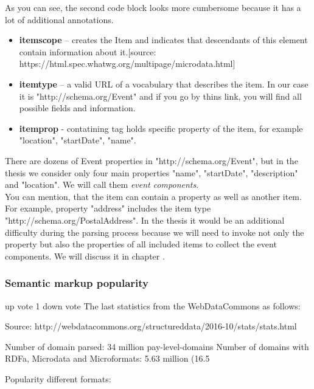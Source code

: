 As you can see, the second code block looks more cumbersome because it has a lot of additional annotations. 

\begin{itemize}
    \item \textbf{itemscope} – creates the Item and indicates that descendants of this element contain information about it.[source: https://html.spec.whatwg.org/multipage/microdata.html]
    \item \textbf{itemtype} – a valid URL of a vocabulary that describes the item. In our case it is "http://schema.org/Event" and if you go by thins link, you will find all possible fields and information. 
    \item \textbf{itemprop} - contatining tag holds specific property of the item, for example "location", "startDate", "name".
\end{itemize}

There are dozens of Event properties in "http://schema.org/Event", but in the thesis we consider only four main properties "name", "startDate", "description" and "location". We will call them \textit{event components}.\\

You can mention, that the item can contain a property as well as another item. For example, property "address" includes the item type "http://schema.org/PostalAddress". In the thesis it would be an additional difficulty during the parsing process because we will need to invoke not only the property but also the properties of all included items to collect the event components. We will discuss it in chapter . 

\subsubsection*{Semantic markup popularity}

up vote
1
down vote
The last statistics from the WebDataCommons as follows:

Source: http://webdatacommons.org/structureddata/2016-10/stats/stats.html

Number of domain parsed: 34 million pay-level-domains
Number of domains with RDFa, Microdata and Microformats: 5.63 million (16.5%

Popularity different formats: 


